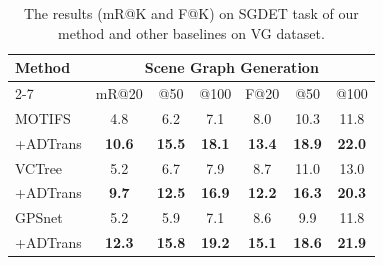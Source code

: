\documentclass[letterpaper]{article} %
\begin{document}
\begin{table}[]
\tabcolsep=0.1cm

\begin{tabular}{l|cccccc}
\hline
\multirow{2}{*}{Method} & \multicolumn{6}{c}{Scene Graph Generation}                                                                         \\ \cline{2-7} 
                        & mR@20         & @50         & \multicolumn{1}{c|}{@100}        & F@20          & @50          & @100         \\ \hline
MOTIFS                  & 4.8           & 6.2           & \multicolumn{1}{c|}{7.1}           & 8.0           & 10.3          & 11.8          \\
\quad +ADTrans                & \textbf{10.6} & \textbf{15.5} & \multicolumn{1}{c|}{\textbf{18.1}} & \textbf{13.4} & \textbf{18.9} & \textbf{22.0} \\ \hline
VCTree                  & 5.2           & 6.7           & \multicolumn{1}{c|}{7.9}           & 8.7           & 11.0          & 13.0          \\
\quad +ADTrans                & \textbf{9.7}  & \textbf{12.5} & \multicolumn{1}{c|}{\textbf{16.9}} & \textbf{12.2} & \textbf{16.3} & \textbf{20.3} \\ \hline
GPSnet                  & 5.2           & 5.9           & \multicolumn{1}{c|}{7.1}           & 8.6           & 9.9           & 11.8          \\
\quad +ADTrans                & \textbf{12.3} & \textbf{15.8} & \multicolumn{1}{c|}{\textbf{19.2}} & \textbf{15.1} & \textbf{18.6} & \textbf{21.9} \\ \hline
\end{tabular}
\caption{The results (mR@K and F@K) on SGDET task of our method and other baselines on VG dataset.}
\label{sgdet}
\end{table}
\end{document}
